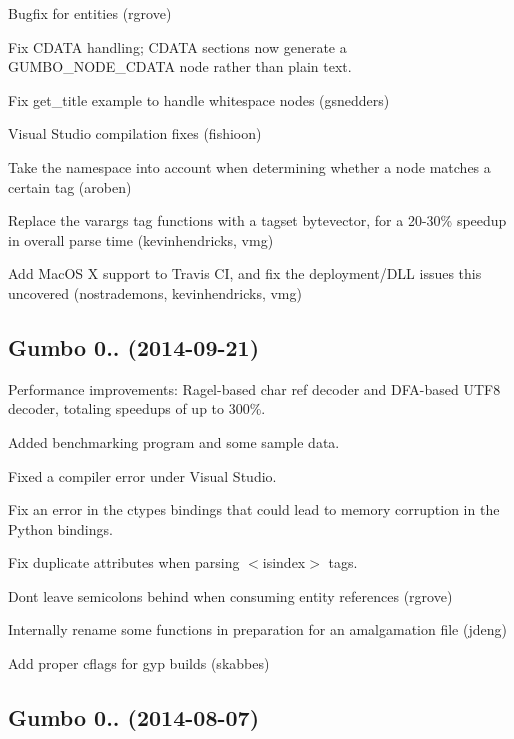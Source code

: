 \begin{DoxyItemize}
\item Bugfix for {\ttfamily {\AE}} entities (rgrove)
\item Fix {\ttfamily C\+D\+A\+TA} handling; {\ttfamily C\+D\+A\+TA} sections now generate a {\ttfamily G\+U\+M\+B\+O\+\_\+\+N\+O\+D\+E\+\_\+\+C\+D\+A\+TA} node rather than plain text.
\item Fix {\ttfamily get\+\_\+title example} to handle whitespace nodes (gsnedders)
\item Visual Studio compilation fixes (fishioon)
\item Take the namespace into account when determining whether a node matches a certain tag (aroben)
\item Replace the varargs tag functions with a tagset bytevector, for a 20-\/30\% speedup in overall parse time (kevinhendricks, vmg)
\item Add Mac\+OS X support to Travis CI, and fix the deployment/\+D\+LL issues this uncovered (nostrademons, kevinhendricks, vmg)
\end{DoxyItemize}

\subsection*{Gumbo 0.. (2014-\/09-\/21)}


\begin{DoxyItemize}
\item Performance improvements\+: Ragel-\/based char ref decoder and D\+F\+A-\/based U\+T\+F8 decoder, totaling speedups of up to 300\%.
\item Added benchmarking program and some sample data.
\item Fixed a compiler error under Visual Studio.
\item Fix an error in the ctypes bindings that could lead to memory corruption in the Python bindings.
\item Fix duplicate attributes when parsing {\ttfamily $<$isindex$>$} tags.
\item Don\textquotesingle{}t leave semicolons behind when consuming entity references (rgrove)
\item Internally rename some functions in preparation for an amalgamation file (jdeng)
\item Add proper cflags for gyp builds (skabbes)
\end{DoxyItemize}

\subsection*{Gumbo 0.. (2014-\/08-\/07)}


